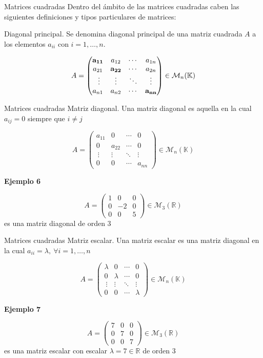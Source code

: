 \documentclass[
  ignorenonframetext,
]{beamer}
\begin{document}
\begin{frame}{Matrices cuadradas}
\protect\hypertarget{matrices-cuadradas}{}
Dentro del ámbito de las matrices cuadradas caben las siguientes
definiciones y tipos particulares de matrices:

Diagonal principal. Se denomina diagonal principal de una matriz
cuadrada \(A\) a los elementos \(a_{ii}\) con \(i = 1,\dots, n\).

\[A = \begin{pmatrix}\bf{a_{11}}&a_{12}&\cdots&a_{1n}\\a_{21}&\bf{a_{22}}&\cdots&a_{2n}\\\ \vdots & \vdots & \ddots& \vdots\\a_{n1}&a_{n2}&\cdots&\bf{a_{nn}}\end{pmatrix}\in\mathcal{M}_n(\mathbb{K})\]
\end{frame}

\begin{frame}{Matrices cuadradas}
\protect\hypertarget{matrices-cuadradas-1}{}
Matriz diagonal. Una matriz diagonal es aquella en la cual \(a_{ij}=0\)
siempre que \(i\ne j\)

\[A = \begin{pmatrix}a_{11}&0&\cdots&0\\0&a_{22}&\cdots&0\\\ \vdots & \vdots & \ddots& \vdots\\0&0&\cdots&a_{nn}\end{pmatrix}\in\mathcal{M}_n(\mathbb{K})\]

\textbf{Ejemplo 6}

\[A=\begin{pmatrix}1&0&0\\0&-2&0\\0&0&5\end{pmatrix}\in\mathcal{M}_3(\mathbb{R})\]
es una matriz diagonal de orden 3
\end{frame}

\begin{frame}{Matrices cuadradas}
\protect\hypertarget{matrices-cuadradas-2}{}
Matriz escalar. Una matriz escalar es una matriz diagonal en la cual
\(a_{ii}=\lambda,\ \forall i=1,\dots,n\)

\[A = \begin{pmatrix}\lambda&0&\cdots&0\\0&\lambda&\cdots&0\\\ \vdots & \vdots & \ddots& \vdots\\0&0&\cdots&\lambda\end{pmatrix}\in\mathcal{M}_n(\mathbb{K})\]

\textbf{Ejemplo 7}

\[A=\begin{pmatrix}7&0&0\\0&7&0\\0&0&7\end{pmatrix}\in\mathcal{M}_3(\mathbb{R})\]
es una matriz escalar con escalar \(\lambda=7\in\mathbb{R}\) de orden 3
\end{frame}
\end{document}
